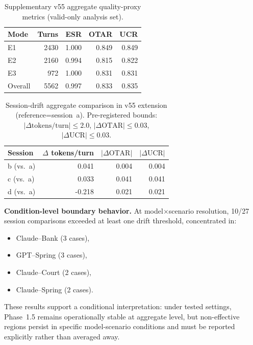\documentclass[11pt,a4paper]{article}
\begin{document}
\begin{table}[ht]
\centering
\begin{tabular}{lrrrr}
\toprule
\textbf{Mode} & \textbf{Turns} & \textbf{ESR} & \textbf{OTAR} & \textbf{UCR} \\
\midrule
E1 & 2430 & 1.000 & 0.849 & 0.849 \\
E2 & 2160 & 0.994 & 0.815 & 0.822 \\
E3 & 972 & 1.000 & 0.831 & 0.831 \\
\midrule
Overall & 5562 & 0.997 & 0.833 & 0.835 \\
\bottomrule
\end{tabular}
\caption{Supplementary v55 aggregate quality-proxy metrics (valid-only analysis set).}
\label{tab:v55_mode_metrics}
\end{table}

\begin{table}[ht]
\centering
\begin{tabular}{lrrr}
\toprule
\textbf{Session} & $\Delta$ tokens/turn & $|\Delta\text{OTAR}|$ & $|\Delta\text{UCR}|$ \\
\midrule
b (vs.\ a) & 0.041 & 0.004 & 0.004 \\
c (vs.\ a) & 0.033 & 0.041 & 0.041 \\
d (vs.\ a) & -0.218 & 0.021 & 0.021 \\
\bottomrule
\end{tabular}
\caption{Session-drift aggregate comparison in v55 extension (reference=session~a).
Pre-registered bounds: $|\Delta\text{tokens/turn}| \le 2.0$, $|\Delta\text{OTAR}| \le 0.03$, $|\Delta\text{UCR}| \le 0.03$.}
\label{tab:v55_session_drift}
\end{table}

\textbf{Condition-level boundary behavior.}
At model$\times$scenario resolution, 10/27 session comparisons exceeded at least
one drift threshold, concentrated in:
\begin{itemize}
    \item Claude--Bank (3 cases),
    \item GPT--Spring (3 cases),
    \item Claude--Court (2 cases),
    \item Claude--Spring (2 cases).
\end{itemize}

These results support a conditional interpretation: under tested settings,
Phase~1.5 remains operationally stable at aggregate level, but non-effective
regions persist in specific model-scenario conditions and must be reported
explicitly rather than averaged away.
\end{document}
